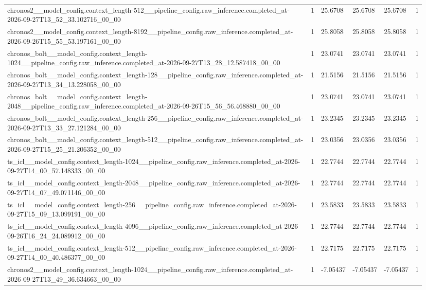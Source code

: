 \begin{tabular}{llllll}
chronos2\_\_model\_config.context\_length-512\_\_pipeline\_config.raw\_inference.completed\_at-2026-09-27T13\_52\_33.102716\_00\_00 & 1 & 25.6708 & 25.6708 & 25.6708 & 1 \\
chronos2\_\_model\_config.context\_length-8192\_\_pipeline\_config.raw\_inference.completed\_at-2026-09-26T15\_55\_53.197161\_00\_00 & 1 & 25.8058 & 25.8058 & 25.8058 & 1 \\
chronos\_bolt\_\_model\_config.context\_length-1024\_\_pipeline\_config.raw\_inference.completed\_at-2026-09-27T13\_28\_12.587418\_00\_00 & 1 & 23.0741 & 23.0741 & 23.0741 & 1 \\
chronos\_bolt\_\_model\_config.context\_length-128\_\_pipeline\_config.raw\_inference.completed\_at-2026-09-27T13\_34\_13.228058\_00\_00 & 1 & 21.5156 & 21.5156 & 21.5156 & 1 \\
chronos\_bolt\_\_model\_config.context\_length-2048\_\_pipeline\_config.raw\_inference.completed\_at-2026-09-26T15\_56\_56.468880\_00\_00 & 1 & 23.0741 & 23.0741 & 23.0741 & 1 \\
chronos\_bolt\_\_model\_config.context\_length-256\_\_pipeline\_config.raw\_inference.completed\_at-2026-09-27T13\_33\_27.121284\_00\_00 & 1 & 23.2345 & 23.2345 & 23.2345 & 1 \\
chronos\_bolt\_\_model\_config.context\_length-512\_\_pipeline\_config.raw\_inference.completed\_at-2026-09-27T15\_25\_21.206352\_00\_00 & 1 & 23.0356 & 23.0356 & 23.0356 & 1 \\
ts\_icl\_\_model\_config.context\_length-1024\_\_pipeline\_config.raw\_inference.completed\_at-2026-09-27T14\_00\_57.148333\_00\_00 & 1 & 22.7744 & 22.7744 & 22.7744 & 1 \\
ts\_icl\_\_model\_config.context\_length-2048\_\_pipeline\_config.raw\_inference.completed\_at-2026-09-27T14\_07\_49.071146\_00\_00 & 1 & 22.7744 & 22.7744 & 22.7744 & 1 \\
ts\_icl\_\_model\_config.context\_length-256\_\_pipeline\_config.raw\_inference.completed\_at-2026-09-27T15\_09\_13.099191\_00\_00 & 1 & 23.5833 & 23.5833 & 23.5833 & 1 \\
ts\_icl\_\_model\_config.context\_length-4096\_\_pipeline\_config.raw\_inference.completed\_at-2026-09-26T16\_24\_24.089912\_00\_00 & 1 & 22.7744 & 22.7744 & 22.7744 & 1 \\
ts\_icl\_\_model\_config.context\_length-512\_\_pipeline\_config.raw\_inference.completed\_at-2026-09-27T14\_00\_40.486377\_00\_00 & 1 & 22.7175 & 22.7175 & 22.7175 & 1 \\
chronos2\_\_model\_config.context\_length-1024\_\_pipeline\_config.raw\_inference.completed\_at-2026-09-27T13\_49\_36.634663\_00\_00 & 1 & -7.05437 & -7.05437 & -7.05437 & 1 \\

\end{tabular}
